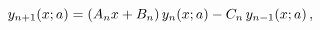 \[\mathop{y_{n+1}\/}\nolimits\!\left(x;a\right)=(A_{n}x+B_{n})\mathop{y_{n}\/}%
\nolimits\!\left(x;a\right)-C_{n}\mathop{y_{n-1}\/}\nolimits\!\left(x;a\right),\]